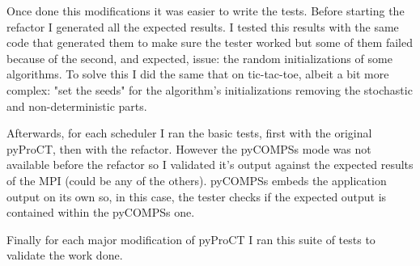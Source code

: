 Once done this modifications it was easier to write the tests. Before starting the refactor I generated all the expected results. I tested this results with the same code that generated them to make sure the tester worked but some of them failed because of the second, and expected, issue: the random initializations of some algorithms. To solve this I did the same that on tic-tac-toe, albeit a bit more complex: "set the seeds" for the algorithm's initializations removing the stochastic and non-deterministic parts.

Afterwards, for each scheduler I ran the basic tests, first with the original pyProCT, then with the refactor. However the pyCOMPSs mode was not available before the refactor so I validated it's output against the expected results of the MPI (could be any of the others). pyCOMPSs embeds the application output on its own so, in this case, the tester checks if the expected output is contained within the pyCOMPSs one.

Finally for each major modification of pyProCT I ran this suite of tests to validate the work done.
